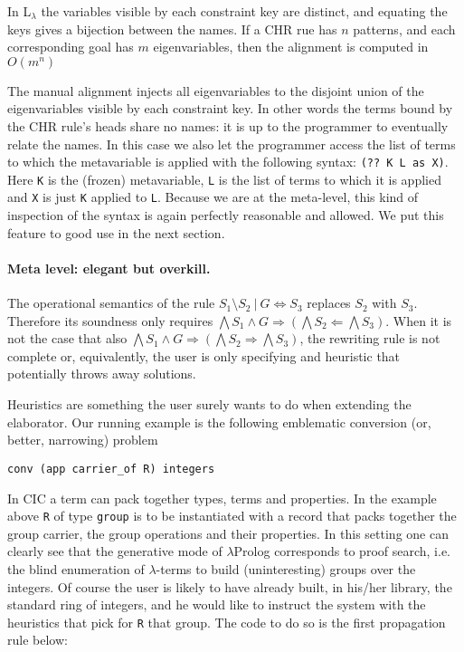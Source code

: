 \documentclass{easychair}
\begin{document}
In L$_\lambda$ the variables visible by each constraint key are distinct,
and equating the keys gives a bijection between the names.
If a CHR rue has $n$ patterns, and each corresponding goal has $m$
eigenvariables, then the alignment is computed in $O(m^n)$

The manual alignment injects all eigenvariables to the disjoint union
of the eigenvariables visible by each constraint key.  In other words
the terms bound by the CHR rule's heads share no names: it is
up to the programmer to eventually relate the names.
In this case we also let the programmer access the list of terms
to which the metavariable is applied with the following syntax:
\verb+(?? K L as X)+.  Here \verb+K+ is the (frozen) metavariable,
\verb+L+ is the list of terms to which it is applied and \verb+X+ is just
\verb+K+ applied to \verb+L+. Because we are at the meta-level, this kind of
inspection of the syntax is again perfectly reasonable and allowed.
We put this feature to good use in the next section.

\paragraph{Meta level: elegant but overkill.}

The operational semantics of the rule
$S_1 \setminus S_2 ~|~ G \iff S_3$ replaces $S_2$ with $S_3$.
Therefore its soundness only requires
$\bigwedge S_1 \wedge G \Rightarrow (\bigwedge
S_2 \Leftarrow \bigwedge S_3)$. When it is not the case that also
$\bigwedge S_1 \wedge G \Rightarrow (\bigwedge S_2 \Rightarrow \bigwedge S_3)$,
the rewriting rule is not complete or, equivalently, the user is only specifying and heuristic that potentially throws away solutions.

Heuristics are something the user surely wants to
do when extending the elaborator.  Our running example
is the following emblematic conversion (or, better, narrowing) problem

\begin{Verbatim}
conv (app carrier_of R) integers
\end{Verbatim}

In CIC a term can pack together types, terms and properties.  In the
example above \verb+R+ of type \verb+group+ is to be instantiated with a record
that packs together the group carrier, the group operations and their properties.
In this setting one can clearly see that the generative mode of $\lambda$Prolog corresponds to proof search, i.e. the blind enumeration of $\lambda$-terms to build (uninteresting) groups over the integers.  Of course the user is likely to have already built, in his/her library, the standard ring of integers, and he would like to instruct the system with the heuristics that pick for \verb+R+ that group. The code to do so is the first propagation rule below:
\end{document}
